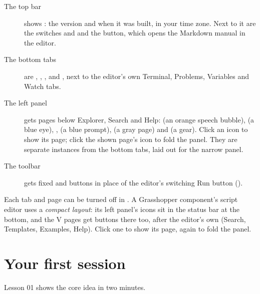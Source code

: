 \begin{description}
  \item[The top bar] shows : the version and when it was
        built, in your time zone. Next to it are the switches  and  and the 
        button, which opens the Markdown manual in the editor.
  \item[The bottom tabs] are , , ,  and , next to the
        editor's own Terminal, Problems, Variables and Watch tabs.
  \item[The left panel] gets pages below Explorer, Search and Help:  (an orange speech bubble),
         (a blue eye), ,  (a blue prompt),  (a gray page) and
         (a gear). Click an icon to show its page; click the shown page's icon to fold the
        panel. They are separate instances from the bottom tabs, laid out for the narrow panel.
  \item[The toolbar] gets fixed  and  buttons in place of the editor's switching Run button
        ().
\end{description}


Each tab and page can be turned off in . A Grasshopper
component's script editor uses a \emph{compact layout}: its left panel's icons sit in the status bar at
the bottom, and the V pages get buttons there too, after the editor's own (Search, Templates,
Examples, Help). Click one to show its page, again to fold the panel.

\section{Your first session}\label{sec:firstsession}

Lesson 01 shows the core idea in two minutes.

